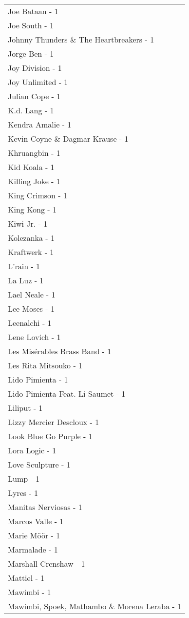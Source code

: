 \documentclass[
]{article}
\begin{document}
\begin{longtable}{l}
Joe Bataan - 1 \\ 
Joe South - 1 \\ 
Johnny Thunders \& The Heartbreakers - 1 \\ 
Jorge Ben - 1 \\ 
Joy Division - 1 \\ 
Joy Unlimited - 1 \\ 
Julian Cope - 1 \\ 
K.d. Lang - 1 \\ 
Kendra Amalie - 1 \\ 
Kevin Coyne \& Dagmar Krause - 1 \\ 
Khruangbin - 1 \\ 
Kid Koala - 1 \\ 
Killing Joke - 1 \\ 
King Crimson - 1 \\ 
King Kong - 1 \\ 
Kiwi Jr. - 1 \\ 
Kolezanka - 1 \\ 
Kraftwerk - 1 \\ 
L'rain - 1 \\ 
La Luz - 1 \\ 
Lael Neale - 1 \\ 
Lee Moses - 1 \\ 
Leenalchi - 1 \\ 
Lene Lovich - 1 \\ 
Les Misérables Brass Band - 1 \\ 
Les Rita Mitsouko - 1 \\ 
Lido Pimienta - 1 \\ 
Lido Pimienta Feat. Li Saumet - 1 \\ 
Liliput - 1 \\ 
Lizzy Mercier Descloux - 1 \\ 
Look Blue Go Purple - 1 \\ 
Lora Logic - 1 \\ 
Love Sculpture - 1 \\ 
Lump - 1 \\ 
Lyres - 1 \\ 
Manitas Nerviosas - 1 \\ 
Marcos Valle - 1 \\ 
Marie Möör - 1 \\ 
Marmalade - 1 \\ 
Marshall Crenshaw - 1 \\ 
Mattiel - 1 \\ 
Mawimbi - 1 \\ 
Mawimbi, Spoek, Mathambo \& Morena Leraba - 1 \\ 

\end{longtable}
\end{document}
